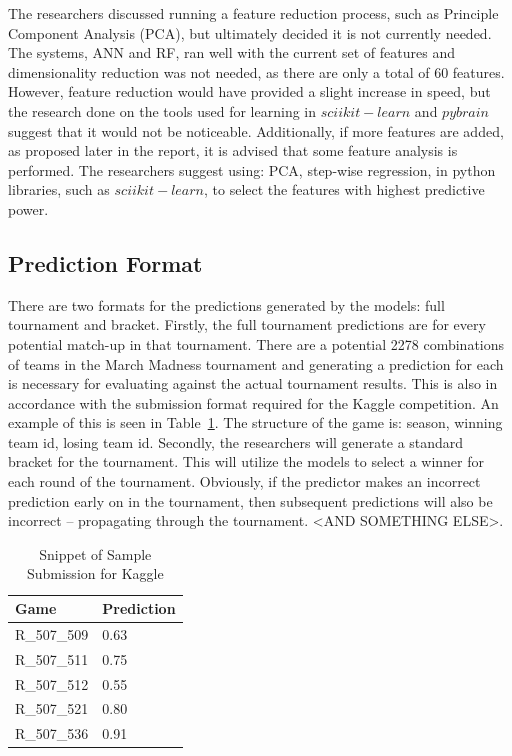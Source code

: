 \documentclass[conference]{IEEEtran}
\begin{document}
{The researchers discussed running a feature reduction process, such as Principle Component Analysis (PCA), but ultimately decided it is not currently needed. 
The systems, ANN and RF, ran well with the current set of features and dimensionality reduction was not needed, as there are only a total of 60 features.
However, feature reduction would have provided a slight increase in speed, but the research done on the tools used for learning in $sciikit-learn$ and $pybrain$ suggest that it would not be noticeable.
Additionally, if more features are added, as proposed later in the report, it is advised that some feature analysis is performed.
The researchers suggest using: PCA, step-wise regression, in python libraries, such as $sciikit-learn$, to select the features with highest predictive power.

\subsection{Prediction Format}
There are two formats for the predictions generated by the models: full tournament and bracket. Firstly, the full tournament predictions are for every potential match-up in that tournament. 
There are a potential 2278 combinations of teams in the March Madness tournament and generating a prediction for each is necessary for evaluating against the actual tournament results. This is also in accordance with the submission format required for the Kaggle competition.
An example of this is seen in Table~\ref{tab:kaggle}. The structure of the game is: season, winning team id, losing team id. Secondly, the researchers will generate a standard bracket for the tournament. This will utilize the models to select a winner for each round of the tournament. 
Obviously, if the predictor makes an incorrect prediction early on in the tournament, then subsequent predictions will also be incorrect -- propagating through the tournament. <AND SOMETHING ELSE>.  %

\begin{table}[H]
\begin{centering}
    \begin{tabular}{|l|l|}
    \hline
    Game        & Prediction \\ \hline
    R\_507\_509 & 0.63       \\ 
    R\_507\_511 & 0.75       \\ 
    R\_507\_512 & 0.55       \\ 
    R\_507\_521 & 0.80       \\ 
    R\_507\_536 & 0.91       \\ \hline
    \end{tabular}
    \label{tab:kaggle}
    \caption{Snippet of Sample Submission for Kaggle}
    \end{centering}
\end{table}

}
\end{document}
